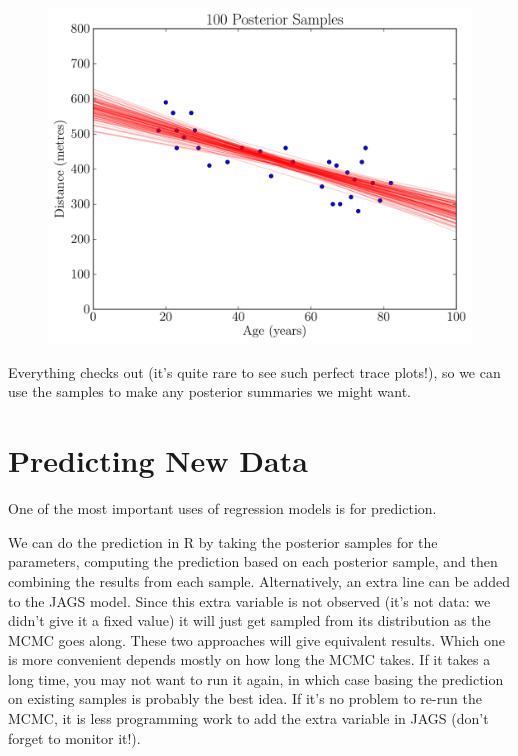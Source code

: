 \begin{figure}[ht!]
\begin{center}
\includegraphics[scale=0.5]{Figures/road_lines.pdf}
\end{center}
\end{figure}

Everything checks out (it's quite rare to see such perfect trace plots!), so
we can use the samples to make any posterior summaries we might want.

\section{Predicting New Data}
One of the most important uses of regression models is for prediction.

We can do the prediction in R by taking the posterior samples for the parameters,
computing the prediction based on each posterior sample, and then combining
the results from each sample. Alternatively, an extra line can be added to the
JAGS model. Since this extra variable is not observed (it's not data: we didn't
give it a fixed value) it will just get sampled from its distribution as the
MCMC goes along. These two approaches will give equivalent results. Which one
is more convenient depends mostly on how long the MCMC takes. If it takes a long
time, you may not want to run it again, in which case basing the prediction on
existing samples is probably the best idea. If it's no problem to re-run the
MCMC, it is less programming work to add the extra variable in JAGS (don't forget
to monitor it!).

